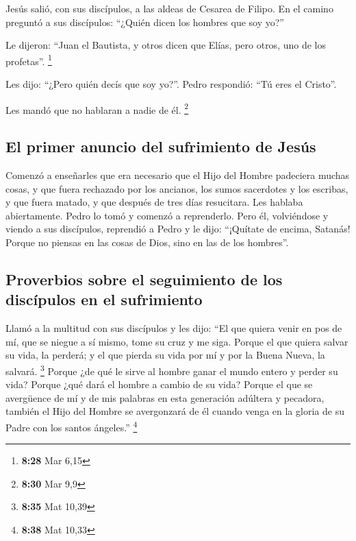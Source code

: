 \begin{paracol}{2}
 Jesús salió, con sus discípulos, a las aldeas de Cesarea
de Filipo. En el camino preguntó a sus discípulos: ``¿Quién dicen los
hombres que soy yo?''

 Le dijeron: ``Juan el Bautista, y otros dicen que Elías,
pero otros, uno de los profetas''. \footnote{\textbf{8:28} Mar 6,15}

 Les dijo: ``¿Pero quién decís que soy yo?''. Pedro
respondió: ``Tú eres el Cristo''.

 Les mandó que no hablaran a nadie de él. \footnote{\textbf{8:30}
  Mar 9,9}

\hypertarget{el-primer-anuncio-del-sufrimiento-de-jesuxfas}{%
\subsection{El primer anuncio del sufrimiento de
Jesús}\label{el-primer-anuncio-del-sufrimiento-de-jesuxfas}}

 Comenzó a enseñarles que era necesario que el Hijo del
Hombre padeciera muchas cosas, y que fuera rechazado por los ancianos,
los sumos sacerdotes y los escribas, y que fuera matado, y que después
de tres días resucitara.  Les hablaba abiertamente. Pedro
lo tomó y comenzó a reprenderlo.  Pero él, volviéndose y
viendo a sus discípulos, reprendió a Pedro y le dijo: ``¡Quítate de
encima, Satanás! Porque no piensas en las cosas de Dios, sino en las de
los hombres''.

\hypertarget{proverbios-sobre-el-seguimiento-de-los-discuxedpulos-en-el-sufrimiento}{%
\subsection{Proverbios sobre el seguimiento de los discípulos en el
sufrimiento}\label{proverbios-sobre-el-seguimiento-de-los-discuxedpulos-en-el-sufrimiento}}

 Llamó a la multitud con sus discípulos y les dijo: ``El
que quiera venir en pos de mí, que se niegue a sí mismo, tome su cruz y
me siga.  Porque el que quiera salvar su vida, la
perderá; y el que pierda su vida por mí y por la Buena Nueva, la
salvará. \footnote{\textbf{8:35} Mat 10,39}  Porque ¿de
qué le sirve al hombre ganar el mundo entero y perder su vida?
 Porque ¿qué dará el hombre a cambio de su vida?
 Porque el que se avergüence de mí y de mis palabras en
esta generación adúltera y pecadora, también el Hijo del Hombre se
avergonzará de él cuando venga en la gloria de su Padre con los santos
ángeles.'' \footnote{\textbf{8:38} Mat 10,33}


\end{paracol}
